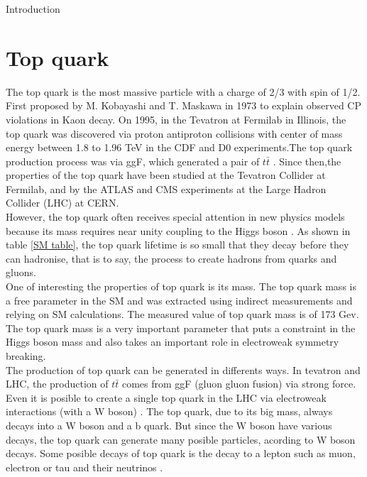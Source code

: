 \begin{chapter}{Introduction}
\pagebreak

\section{Top quark}
The top quark  is the most massive particle  with a charge of 2/3 with spin of 1/2. First proposed by  M. Kobayashi and T. Maskawa in 1973 to explain observed CP violations in Kaon decay\cite{griff}. On 1995, in the Tevatron at Fermilab in Illinois, the top quark  was discovered via proton antiproton collisions with center of mass energy between 1.8 to 1.96 TeV in the CDF and D0 experiments.The top quark production process was via ggF, which generated a pair of $t\bar{t}$\cite{top} .
Since then,the properties of the top quark have been studied at the Tevatron Collider at Fermilab, and by the ATLAS and CMS experiments at the Large Hadron Collider (LHC) at CERN.\\
However, the top quark often receives special attention in new physics models because its mass requires near unity coupling to the Higgs boson \cite{top}.
As shown in table \ref{SM table}, the top quark lifetime is so small that they decay before they can hadronise, that is to say, the process to create hadrons from quarks and gluons.\\

One of  interesting the properties of top quark is its mass.
The top quark mass is a free parameter in the SM and was extracted using indirect measurements and relying on SM calculations. The measured value of top quark mass is of 173 Gev\cite{pd}.
The top quark mass is a very important
parameter that puts a constraint in the Higgs boson mass and also takes an important role in electroweak symmetry breaking\cite{top}.\\

The production of top quark can be generated in differents ways. In tevatron and LHC, the production of $t\bar{t}$ comes from ggF (gluon gluon fusion) via strong force. Even it is posible to create a single top quark in the LHC via electroweak interactions (with a W boson) \cite{th1}.  
The top quark, due to its big mass, always decays into a W boson and a b quark. But since the W boson have various decays, the top quark can generate many posible particles, acording to W boson decays. Some posible decays of top quark is the decay to a lepton such as muon, electron or tau and their neutrinos . %


\end{chapter}
